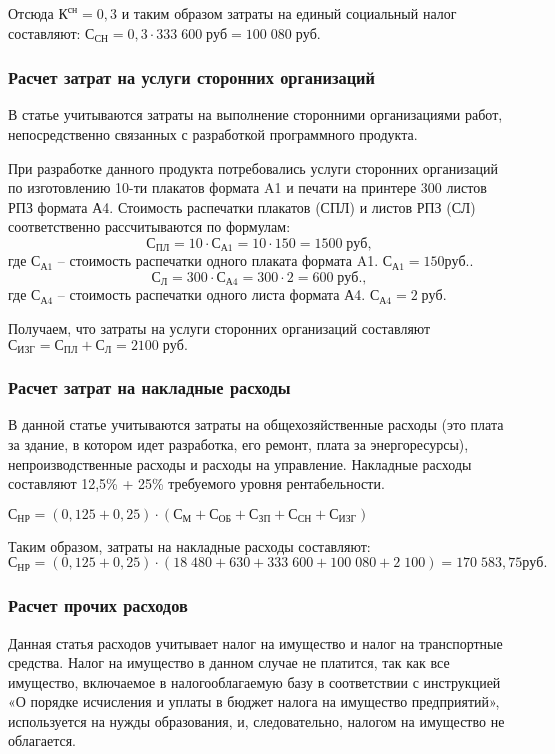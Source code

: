 Отсюда  $К^{сн} = 0,3$  и таким образом затраты на единый социальный налог составляют: $С_{СН} = 0,3  \cdot 333 \; 600  \; руб = 100 \; 080 \; руб.$

\subsubsection{Расчет затрат на услуги сторонних организаций} 

В статье учитываются затраты на выполнение сторонними организациями работ, непосредственно связанных с разработкой программного продукта.

При разработке данного продукта потребовались услуги сторонних организаций по изготовлению 10-ти плакатов формата A1 и печати на принтере 300 листов РПЗ формата А4.  Стоимость распечатки плакатов  (СПЛ) и листов РПЗ (СЛ) соответственно  рассчитываются  по формулам:
$$С_{ПЛ} =10 \cdot С_{А1} = 10 \cdot 150 = 1500 \; руб,$$
где $С_{А1}$ – стоимость распечатки одного плаката формата A1.   $С_{А1}  = 150 руб.$.
$$С_Л =300 \cdot С_{А4} = 300 \cdot 2 = 600 \; руб.,$$
где $С_{А4}$ – стоимость распечатки одного листа  формата А4. $С_{А4}  = 2 \; руб.$

Получаем, что затраты на услуги сторонних организаций составляют
$С_{ИЗГ}= С_{ПЛ} + С_Л = 2100 \; руб.$

\subsubsection{Расчет затрат на накладные расходы}
В данной статье учитываются затраты на общехозяйственные расходы (это плата за здание, в котором идет разработка, его ремонт, плата за энергоресурсы), непроизводственные расходы и расходы на управление.
Накладные расходы составляют 12,5\% + 25\% требуемого уровня рентабельности.
 
$С_{НР}  =(0,125+0,25) \cdot (С_М + С_{ОБ} + С_{ЗП} + С_{СН} + С_{ИЗГ})$

Таким образом,  затраты на накладные расходы составляют:  
$С_{НР}  = (0,125+0,25) \cdot (18 \; 480+ 630 + 333 \; 600+ 100 \; 080 + 2 \; 100) =170 \; 583,75 руб.$

\subsubsection{Расчет прочих расходов}

Данная статья расходов учитывает налог на имущество и налог на транспортные средства. Налог на имущество в данном случае не платится, так как  все имущество, включаемое в налогооблагаемую базу в соответствии с инструкцией «О порядке исчисления и уплаты в бюджет налога на имущество предприятий», используется на нужды образования, и, следовательно, налогом на имущество не облагается.


